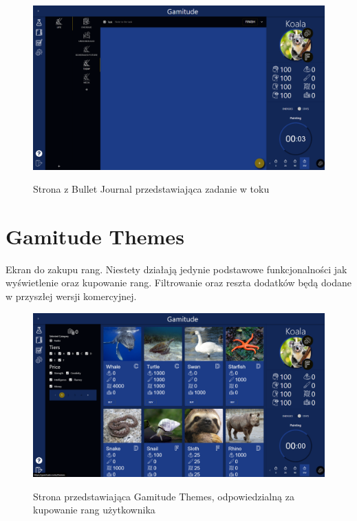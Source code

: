 \documentclass[a4paper,11pt]{report}
\begin{document}
\begin{figure}[H]
	\centering
	\includegraphics[scale=0.3]{prezentacja/Bullet_Session}\\
	\caption{Strona z Bullet Journal przedstawiająca zadanie w toku}
	\label{fig:Bullet_Session}
\end{figure}
\section{Gamitude Themes}
Ekran do zakupu rang. Niestety działają jedynie podstawowe funkcjonalności jak wyświetlenie oraz kupowanie rang.
Filtrowanie oraz reszta dodatków będą dodane w przyszłej wersji komercyjnej.
\begin{figure}[H]
	\centering
	\includegraphics[scale=0.3]{prezentacja/Gamitude_Themes}\\
	\caption{Strona przedstawiająca Gamitude Themes, odpowiedzialną za kupowanie rang użytkownika}
	\label{fig:Gamitude_Themes}
\end{figure}
\end{document}
